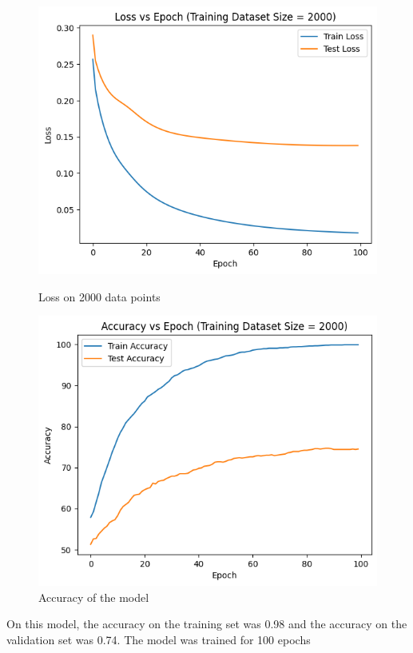 \documentclass{article}
\begin{document}
\begin{figure}[h!]
    \centering
    \begin{minipage}{0.45\textwidth}
        \centering
        \includegraphics[width=1\textwidth]{graphs/output2000.png} %
        \caption{Loss on 2000 data points}
    \end{minipage}\hfill
    \begin{minipage}{0.45\textwidth}
        \centering
        \includegraphics[width=1\textwidth]{graphs/acc2000.png} %
        \caption{Accuracy of the model}
    \end{minipage}
\end{figure}
\newline On this model, the accuracy on the training set was 0.98 and the accuracy on the validation set was 0.74. The model was trained for 100 epochs
\end{document}
